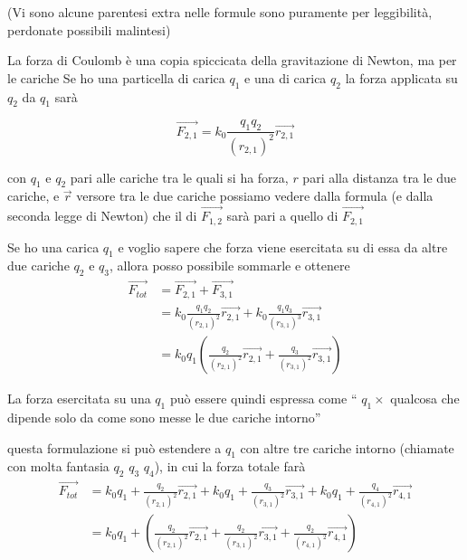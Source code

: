 \documentclass{article}
\begin{document}
(Vi sono alcune parentesi extra nelle formule sono puramente per leggibilità, perdonate possibili malintesi)

La forza di Coulomb è una copia spiccicata della gravitazione di Newton, ma per le cariche
Se ho una particella di carica $q_1$ e una di carica $q_2$ la forza applicata su $q_2$ da $q_1$ sarà

\begin{equation*}
  \overrightarrow{F_{2,1}} = k_0 \frac{q_1 q_2}{(r_{2,1})^2}\overrightarrow{r_{2,1}}
\end{equation*}

con $q_1$ e $q_2$ pari alle cariche tra le quali si ha forza, $r$ pari alla distanza tra le due cariche, e $\overrightarrow{r}$ versore tra le due cariche 
possiamo vedere dalla formula (e dalla seconda legge di Newton) che il di $\overrightarrow{F_{1,2}}$ sarà pari a quello di $\overrightarrow{F_{2,1}}$

Se ho una carica $q_1$ e voglio sapere che forza viene esercitata su di essa da altre due cariche $q_2$ e $q_3$, allora posso  possibile sommarle e ottenere
\begin{align*}
  \overrightarrow{F_{tot}} &= \overrightarrow{F_{2,1}} + \overrightarrow{F_{3,1}} \\
                          &= k_0 \frac{q_1 q_2}{(r_{2,1})^2}\overrightarrow{r_{2,1}} +
                             k_0 \frac{q_1 q_3}{(r_{3,1})^3}\overrightarrow{r_{3,1}} \\
                          &= k_0 q_1(\frac{q_2}{(r_{2,1})^2}\overrightarrow{r_{2,1}}+
                                     \frac{q_3}{(r_{3,1})^2}\overrightarrow{r_{3,1}})
\end{align*}

La forza esercitata su una $q_1$ può essere quindi espressa come `` $q_1 \times$ qualcosa che dipende solo da come sono messe le due cariche intorno''

questa formulazione si può estendere a $q_1$ con altre tre cariche intorno (chiamate con molta fantasia $q_2$ $q_3$ $q_4$), in cui la forza totale farà
\begin{align*}
  \overrightarrow{F_{tot}} &= k_0 q_1 + \frac{q_2}{(r_{2,1})^2}\overrightarrow{r_{2,1}}
                                      + k_0 q_1 + \frac{q_3}{(r_{3,1})^2}\overrightarrow{r_{3,1}}
                                      + k_0 q_1 + \frac{q_4}{(r_{4,1})^2}\overrightarrow{r_{4,1}} \\
                           &= k_0 q_1 + (\frac{q_2}{(r_{2,1})^2}\overrightarrow{r_{2,1}}
                                      +  \frac{q_2}{(r_{3,1})^2}\overrightarrow{r_{3,1}}
                                      +  \frac{q_2}{(r_{4,1})^2}\overrightarrow{r_{4,1}})
\end{align*}
\end{document}
